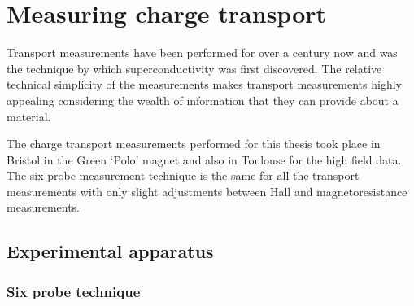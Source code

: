 
\section{Measuring charge transport}

Transport measurements have been performed for over a century now and was the technique by which superconductivity was first discovered. The relative technical simplicity of the measurements makes transport measurements highly appealing considering the wealth of information that they can provide about a material.

The charge transport measurements performed for this thesis took place in Bristol in the Green `Polo' magnet and also in Toulouse for the high field data. The six-probe measurement technique is the same for all the transport measurements with only slight adjustments between Hall and magnetoresistance measurements.

\subsection{Experimental apparatus}

\subsubsection{Six probe technique}

